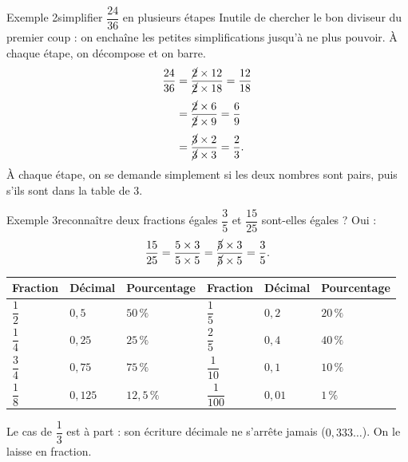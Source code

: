 \begin{exemple}{Exemple 2}{simplifier $\dfrac{24}{36}$ en plusieurs étapes}
Inutile de chercher le bon diviseur du premier coup : on enchaîne les petites
simplifications jusqu'à ne plus pouvoir. À chaque étape, on décompose et on barre.
\begin{align*}
  \frac{24}{36} &= \frac{\cancel{2} \times 12}{\cancel{2} \times 18} = \frac{12}{18} \\[0.3em]
                &= \frac{\cancel{2} \times 6}{\cancel{2} \times 9}   = \frac{6}{9}   \\[0.3em]
                &= \frac{\cancel{3} \times 2}{\cancel{3} \times 3}   = \frac{2}{3}.
\end{align*}
À chaque étape, on se demande simplement si les deux nombres sont pairs, puis s'ils
sont dans la table de $3$.
\end{exemple}

\begin{exemple}{Exemple 3}{reconnaître deux fractions égales}
$\dfrac{3}{5}$ et $\dfrac{15}{25}$ sont-elles égales ? Oui :
\[ \frac{15}{25} = \frac{5 \times 3}{5 \times 5}
                 = \frac{\cancel{5} \times 3}{\cancel{5} \times 5}
                 = \frac{3}{5}. \]
\end{exemple}

\begin{aretenir}[title={Les équivalences à connaître par cœur}]
\begin{center}
\renewcommand{\arraystretch}{1.4}
\newcommand{\rhb}{\rule[-1.5em]{0pt}{4em}}
\begin{tabular}{|>{\centering\arraybackslash}m{1.6cm}|>{\centering\arraybackslash}m{1.6cm}|>{\centering\arraybackslash}m{2.5cm}
                ||>{\centering\arraybackslash}m{1.6cm}|>{\centering\arraybackslash}m{1.6cm}|>{\centering\arraybackslash}m{2.5cm}|}
\hline
\rowcolor{entete}
\centering\textbf{Fraction} & \centering\textbf{Décimal} & \centering\textbf{Pourcentage} &
\centering\textbf{Fraction} & \centering\textbf{Décimal} & \textbf{Pourcentage} \\
\hline
\rhb $\dfrac{1}{2}$ & $0{,}5$   & $50\,\%$     & $\dfrac{1}{5}$   & $0{,}2$  & $20\,\%$ \\ \hline
\rhb $\dfrac{1}{4}$ & $0{,}25$  & $25\,\%$     & $\dfrac{2}{5}$   & $0{,}4$  & $40\,\%$ \\ \hline
\rhb $\dfrac{3}{4}$ & $0{,}75$  & $75\,\%$     & $\dfrac{1}{10}$  & $0{,}1$  & $10\,\%$ \\ \hline
\rhb $\dfrac{1}{8}$ & $0{,}125$ & $12{,}5\,\%$ & $\dfrac{1}{100}$ & $0{,}01$ & $1\,\%$ \\ \hline
\end{tabular}
\end{center}

Le cas de $\dfrac{1}{3}$ est à part : son écriture décimale ne s'arrête jamais
($0{,}333\ldots$). On le laisse en fraction.
\end{aretenir}

